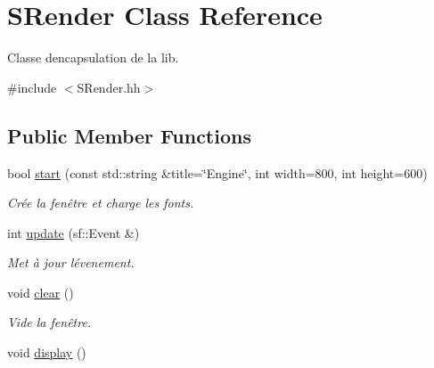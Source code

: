 \hypertarget{class_s_render}{}\section{S\+Render Class Reference}
\label{class_s_render}


Classe d\textquotesingle{}encapsulation de la lib.  




{\ttfamily \#include $<$S\+Render.\+hh$>$}

\subsection*{Public Member Functions}
\begin{DoxyCompactItemize}
\item 
bool \hyperlink{class_s_render_abb69688a391dc00b1f34fa4401cfdcf3}{start} (const std\+::string \&title=\char`\"{}Engine\char`\"{}, int width=800, int height=600)
\begin{DoxyCompactList}\small\item\em Crée la fenêtre et charge les fonts. \end{DoxyCompactList}\item 
int \hyperlink{class_s_render_a40af2814effd6e6428180e4286ef084b}{update} (sf\+::\+Event \&)
\begin{DoxyCompactList}\small\item\em Met à jour l\textquotesingle{}évenement. \end{DoxyCompactList}\item 
\hypertarget{class_s_render_ad2277608f2957dd12f615cf7e66efa27}{}void \hyperlink{class_s_render_ad2277608f2957dd12f615cf7e66efa27}{clear} ()\label{class_s_render_ad2277608f2957dd12f615cf7e66efa27}

\begin{DoxyCompactList}\small\item\em Vide la fenêtre. \end{DoxyCompactList}\item 
\hypertarget{class_s_render_a012ea056e412a5fd2323aaa46dbf112d}{}void \hyperlink{class_s_render_a012ea056e412a5fd2323aaa46dbf112d}{display} ()\label{class_s_render_a012ea056e412a5fd2323aaa46dbf112d}


\end{DoxyCompactItemize}

